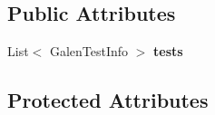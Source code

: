 \subsection*{Public Attributes}
\begin{DoxyCompactItemize}
\item 
\hypertarget{classcom_1_1zeuslearning_1_1automation_1_1selenium_1_1interactions_1_1BrowserWindow_aa0105b1d008a48e9a49a8845eedc03a7}{}\label{classcom_1_1zeuslearning_1_1automation_1_1selenium_1_1interactions_1_1BrowserWindow_aa0105b1d008a48e9a49a8845eedc03a7} 
List$<$ Galen\+Test\+Info $>$ {\bfseries tests}
\end{DoxyCompactItemize}
\subsection*{Protected Attributes}
